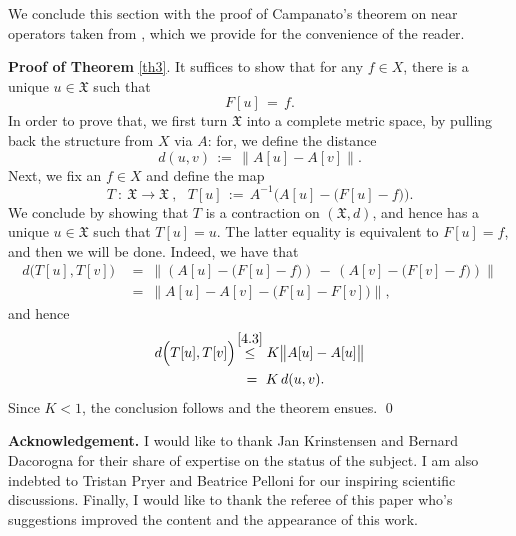 \documentclass{amsart}
\theoremstyle{definition}
\numberwithin{equation}{section}
\begin{document}
{\medskip}

We conclude this section with the proof of Campanato's theorem on near operators taken from \cite{C0}, which we provide for the convenience of the reader. 

{\medskip \noindent \textbf{Proof of Theorem} } \ref{th3}. It suffices to show that for any $f\in X$, there is a unique $u\in \mathfrak{X}$ such that
\[
F[u]\, =\, f.
\]
In order to prove that, we first turn $\mathfrak{X}$ into a complete metric space, by pulling back the structure from $X$ via $A$: for, we define the distance
\[
d(u,v)\, :=\, \big\| A[u]-A[v]\big\|.
\]
Next, we fix an $f\in X$ and define the map
\[
T\ : \ \mathfrak{X} {\longrightarrow} \mathfrak{X}\ , \ \ \ T[u]\, :=\, A^{-1}\Big(A[u]-\big(F[u]-f \big) \Big).
\]
We conclude by showing that $T$ is a contraction on $(\mathfrak{X},d)$, and hence has a unique $u\in \mathfrak{X}$ such that $T[u]=u$. The latter equality is equivalent to $F[u]=f$, and then we will be done.  Indeed, we have that
\begin{align}
d\Big( T[u],T[v] \Big)  \, &=\ \Big\|  \left(A[u]-\big(F[u]-f \big) \right) \, -\,  \left(A[v]-\big(F[v]-f \big) \right) \Big\| \nonumber \\
 &=\ \Big\| A[u] -A[v] -\big(F[u]  - F[v]\big) \Big\|, \nonumber 
\end{align}
and hence
\begin{align}
d\Big( T[u],T[v] \Big)  \ \, 
&\!\!\!\!\overset{\eqref{4.3}}{\leq}   K \big\| A[u]-A[u] \big\| \nonumber\\
  &= \  K \, d(u,v). \nonumber
\end{align}
Since $K<1$, the conclusion follows and the theorem ensues.              \qed

{\medskip}

{\medskip}

{\noindent} \textbf{Acknowledgement.} I would like to thank Jan Krinstensen and Bernard Dacorogna for their share of expertise on the status of the subject. I am also indebted to Tristan Pryer and Beatrice Pelloni for our inspiring scientific discussions. Finally, I would like to thank the referee of this paper who's suggestions improved the content and the appearance of this work.

{\medskip}

{\medskip}
\end{document}

